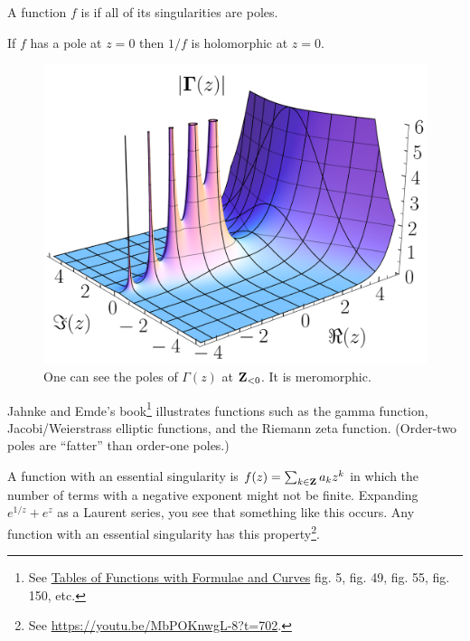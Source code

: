 \documentclass[11pt, oneside,margin=1in]{article}
\begin{document}
\begin{definition}[ ]\label{}\text{}
        A function $f$ is  if all of its singularities are poles.
\end{definition}

If $f$ has a pole at $z=0$ then $1/f$ is holomorphic at $z=0$.

\begin{figure}
	\begin{center}
		\includegraphics[scale=0.2]{abs_gamma}
		\caption{One can see the poles of $\Gamma(z)$ at $\mathbf Z_{<0}$. It is meromorphic.}
	\end{center}
\end{figure}

Jahnke and Emde's book\footnote{See \underline{Tables of Functions with Formulae and Curves} fig. 5, fig. 49, fig. 55, fig. 150, etc.} illustrates functions such as the gamma function, Jacobi/Weierstrass elliptic functions, and the Riemann zeta function. (Order-two poles are ``fatter'' than order-one poles.)

A function with an essential singularity is $f(z)=\sum_{k\in \mathbf Z}a_kz^k$ in which the number of terms with a negative exponent might not be finite. Expanding $e^{1/z} +e^z$ as a Laurent series, you see that something like this occurs. Any function with an essential singularity has this property\footnote{See \url{https://youtu.be/MbPOKnwgL-8?t=702}.}.
\end{document}
